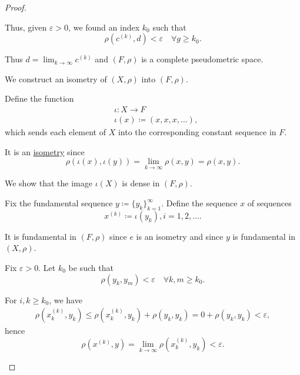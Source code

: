 \begin{proof}
\begin{ThmEnum}
    Thus, given \( \varepsilon > 0 \), we found an index \( k_0 \) such that
    \begin{equation*}
      \rho(c^{(k)}, d) < \varepsilon \quad\forall g \geq k_0.
    \end{equation*}

    Thus \( d = \lim_{k \to \infty} c^{(k)} \) and \( (F, \rho) \) is a complete pseudometric space.

     We construct an isometry of \( (X, \rho) \) into \( (F, \rho) \).

    Define the function
    \begin{align*}
       & \iota: X \to F                        \\
       & \iota(x) \coloneqq (x, x, x, \ldots),
    \end{align*}
    which sends each element of \( X \) into the corresponding constant sequence in \( F \).

    It is an \hyperref[def:isometry]{isometry} since
    \begin{equation*}
      \rho(\iota(x),\iota(y)) = \lim_{k \to \infty} \rho(x, y) = \rho(x, y).
    \end{equation*}

     We show that the image \( \iota(X) \) is dense in \( (F, \rho) \).

    Fix the fundamental sequence \( y \coloneqq \{ y_k \}_{k=1}^\infty \). Define the sequence \( x \) of sequences
    \begin{equation*}
      x^{(k)} \coloneqq \iota(y_k), i = 1, 2, \ldots.
    \end{equation*}

    It is fundamental in \( (F, \rho) \) since \( e \) is an isometry and since \( y \) is fundamental in \( (X, \rho) \).

    Fix \( \varepsilon > 0 \). Let \( k_0 \) be such that
    \begin{equation*}
      \rho(y_k, y_m) < \varepsilon \quad\forall k, m \geq k_0.
    \end{equation*}

    For \( i, k \geq k_0 \), we have
    \begin{align*}
      \rho(x_k^{(k)}, y_k)
      \leq
      \rho(x_k^{(k)}, y_k) + \rho(y_k, y_k)
      =
      0 + \rho(y_k, y_k)
      <
      \varepsilon,
    \end{align*}
    hence
    \begin{equation*}
      \rho(x^{(k)}, y) = \lim_{k \to \infty} \rho(x_k^{(k)}, y_k) < \varepsilon.
    \end{equation*}


\end{ThmEnum}
\end{proof}
